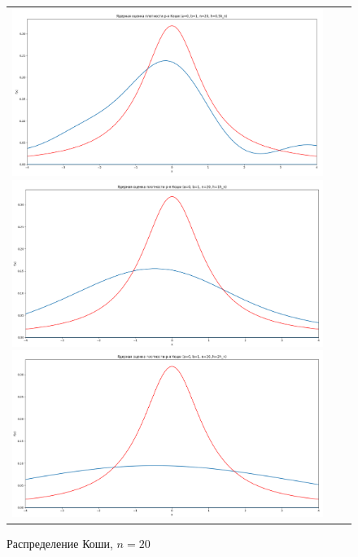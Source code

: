 \begin{figure}[H]
	\begin{tabular}{ccc}
		\includegraphics[scale=0.14]{resources/4_cauchy_20_half.png}
		\includegraphics[scale=0.14]{resources/4_cauchy_20_one.png}
		\includegraphics[scale=0.14]{resources/4_cauchy_20_two.png}
	\end{tabular}
	\caption{Распределение Коши, $n=20$}
\end{figure}


